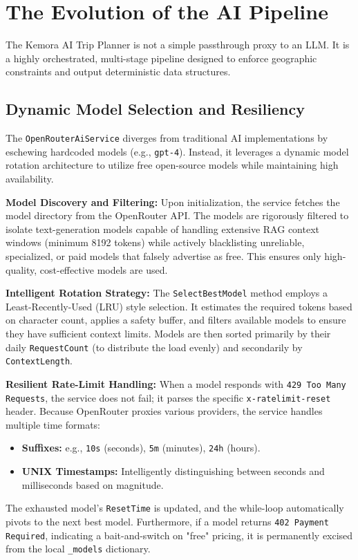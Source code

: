 \section{The Evolution of the AI Pipeline}
The Kemora AI Trip Planner is not a simple passthrough proxy to an LLM. It is a highly orchestrated, multi-stage pipeline designed to enforce geographic constraints and output deterministic data structures.

\subsection{Dynamic Model Selection and Resiliency}
The \texttt{OpenRouterAiService} diverges from traditional AI implementations by eschewing hardcoded models (e.g., \texttt{gpt-4}). Instead, it leverages a dynamic model rotation architecture to utilize free open-source models while maintaining high availability.

\textbf{Model Discovery and Filtering:}
Upon initialization, the service fetches the model directory from the OpenRouter API. The models are rigorously filtered to isolate text-generation models capable of handling extensive RAG context windows (minimum 8192 tokens) while actively blacklisting unreliable, specialized, or paid models that falsely advertise as free. This ensures only high-quality, cost-effective models are used.

\textbf{Intelligent Rotation Strategy:}
The \texttt{SelectBestModel} method employs a Least-Recently-Used (LRU) style selection. It estimates the required tokens based on character count, applies a safety buffer, and filters available models to ensure they have sufficient context limits. Models are then sorted primarily by their daily \texttt{RequestCount} (to distribute the load evenly) and secondarily by \texttt{ContextLength}.

\textbf{Resilient Rate-Limit Handling:}
When a model responds with \texttt{429 Too Many Requests}, the service does not fail; it parses the specific \texttt{x-ratelimit-reset} header. Because OpenRouter proxies various providers, the service handles multiple time formats:
\begin{itemize}
    \item \textbf{Suffixes:} e.g., \texttt{10s} (seconds), \texttt{5m} (minutes), \texttt{24h} (hours).
    \item \textbf{UNIX Timestamps:} Intelligently distinguishing between seconds and milliseconds based on magnitude.
\end{itemize}
The exhausted model's \texttt{ResetTime} is updated, and the while-loop automatically pivots to the next best model. Furthermore, if a model returns \texttt{402 Payment Required}, indicating a bait-and-switch on "free" pricing, it is permanently excised from the local \texttt{\_models} dictionary.

